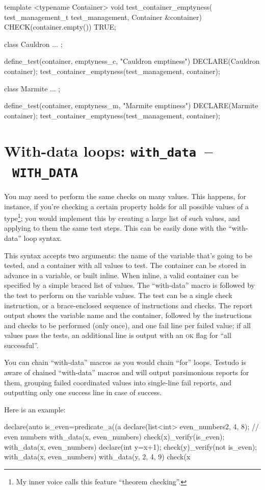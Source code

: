 \documentclass[twoside, a4paper, article]{memoir}
\newcommand*\testudocolor{\color{red!80!blue}}
\newcommand*\testudo[1]{\texttt{\testudocolor{}#1}}
\newcommand*\testudopair[2]{\testudo{#1}~--~\testudo{#2}}
\newcommand\chaptertestudopair[3]{%
  \chapter[#1]{#1: \testudopair{#2}{#3}}}
\begin{document}
\begin{cpplisting}
template <typename Container>
void test_container_emptyness(
    test_management_t test_management,
    Container &container)
{
  CHECK(container.empty()) TRUE;
}

class Cauldron { ... };

define_test(container, emptyness_c, "Cauldron emptiness")
{
  DECLARE(Cauldron container);
  test_container_emptyness(test_management, container);
}

class Marmite { ... };

define_test(container, emptyness_m, "Marmite emptiness")
{
  DECLARE(Marmite container);
  test_container_emptyness(test_management, container);
}
\end{cpplisting}


\chaptertestudopair{With-data loops}{with\_data}{WITH\_DATA}
\label{cha:with-data-loops}

You may need to perform the same checks on many values.  This happens, for
instance, if you're checking a certain property holds for all possible values
of a type\footnote{My inner voice calls this feature ``theorem checking''.};
you would implement this by creating a large list of such values, and applying
to them the same test steps.  This can be easily done with the ``with-data''
loop syntax.

This syntax accepts two arguments: the name of the variable that's going to be
tested, and a container with all values to test.  The container can be stored
in advance in a variable, or built inline.  When inline, a valid container can
be specified by a simple braced list of values.  The ``with-data'' macro is
followed by the test to perform on the variable values.  The test can be a
single check instruction, or a brace-enclosed sequence of instructions and
checks.  The report output shows the variable name and the container, followed
by the instructions and checks to be performed (only once), and one fail line
per failed value; if all values pass the tests, an additional line is output
with an \textsc{ok} flag for ``all successful''.

You can chain ``with-data'' macros as you would chain ``for'' loops.  Testudo
is aware of chained ``with-data'' macros and will output parsimonious reports
for them, grouping failed coordinated values into single-line fail reports, and
outputting only one success line in case of success.

Here is an example:
\begin{cpplisting}
declare(auto is_even=predicate_a((a%
declare(list<int> even_numbers{2, 4, 8}); // even numbers
with_data(x, even_numbers)
  check(x)_verify(is_even);
with_data(x, even_numbers) {
  declare(int y=x+1);
  check(y)_verify(not is_even);
}
with_data(x, even_numbers)
  with_data(y, {2, 4, 9})
    check(x%
\end{cpplisting}
\end{document}

